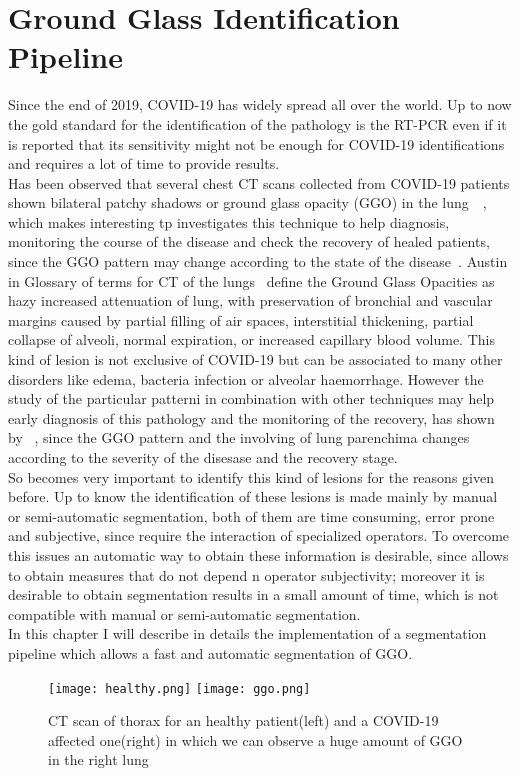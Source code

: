 \documentclass{standalone}
\begin{document}
	\chapter{Ground Glass Identification Pipeline}
	
	Since the end of 2019, COVID-19 has widely spread all over the world. Up to now the gold standard for the identification of the pathology is the 
	RT-PCR even if it is reported that its sensitivity might not be enough for COVID-19 identifications~\cite{ART:Ai} and requires a lot of time to provide results.\\Has been observed that  several chest CT scans collected from COVID-19 patients shown bilateral patchy shadows or ground glass opacity (GGO) in the lung~\cite{ART:Ai}~\cite{ART:Wang}, which makes interesting tp investigates this technique to help diagnosis, monitoring the course of the disease and check the recovery of healed patients, since the GGO pattern may change according to the state of the disease~\cite{ART:Bernheim}.
	Austin in Glossary of terms for CT of the lungs~\cite{ART:Austin} define the Ground Glass Opacities as hazy increased attenuation of lung, with 
	preservation of bronchial and vascular margins caused by partial filling of air spaces, interstitial thickening, partial collapse of alveoli, normal expiration, or increased capillary blood volume. This kind of lesion is not exclusive of COVID-19 but can be associated to many other disorders like edema, bacteria infection or alveolar haemorrhage.  
	However the study of the particular patterni in combination with other techniques may help early diagnosis of this pathology and the monitoring of the recovery, has shown by ~\cite{ART:Bernheim}, since the GGO pattern and the involving of lung parenchima changes according to the severity of the disesase and the recovery stage.\\
	
	So becomes very important to identify this kind of lesions for the reasons given before. Up to know the identification of these lesions is made mainly by manual or semi-automatic segmentation, both of them are time consuming, error prone and subjective, since require the interaction of specialized operators. To overcome this issues an automatic way to obtain these information is desirable, since allows to obtain measures that do not depend n operator subjectivity; moreover it is desirable to obtain segmentation results in a small amount of time, which is not compatible with manual or semi-automatic segmentation.\\
	
	In this chapter I will describe in details the implementation of a segmentation pipeline which allows a fast and automatic segmentation of GGO. 
	
		 
	
	\begin{figure}[h!]\label{fig:HealthVSCovid}
		\centering
		\texttt{[image: healthy.png]}
		\quad
		\texttt{[image: ggo.png]}
		\caption{CT scan of thorax for an healthy patient(left) and a COVID-19 affected one(right) in which we can observe a huge amount of GGO in the right lung}
	\end{figure} 
	
	
\end{document}
